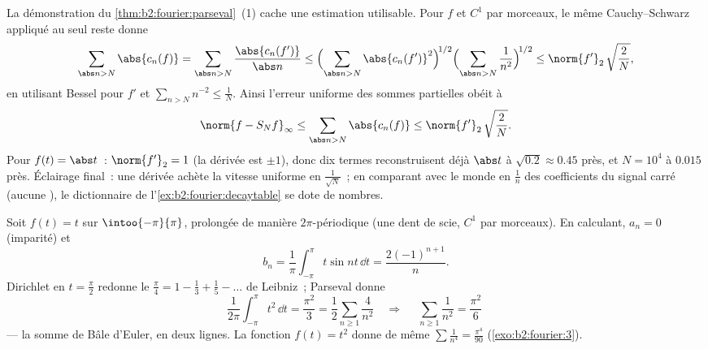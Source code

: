 \begin{example}\label{ex:b2:fourier:tailbound}
La démonstration du \cref{thm:b2:fourier:parseval}~(1) cache une
estimation utilisable. Pour $f$  et $C^1$ par morceaux, le
même Cauchy--Schwarz appliqué au seul reste donne
\[
\sum_{\abs n > N}\abs{c_n(f)}
= \sum_{\abs n > N}\frac{\abs{c_n(f')}}{\abs n}
\leq \Bigl(\sum_{\abs n > N}\abs{c_n(f')}^2\Bigr)^{\!1/2}
\Bigl(\sum_{\abs n>N}\frac{1}{n^2}\Bigr)^{\!1/2}
\leq \norm{f'}_2\,\sqrt{\frac{2}{N}} ,
\]
en utilisant Bessel pour $f'$ et $\sum_{n>N}n^{-2} \leq \frac1N$.
Ainsi l'erreur uniforme des sommes partielles obéit à
\[
\norm{f - S_Nf}_\infty
\leq \sum_{\abs n>N}\abs{c_n(f)}
\leq \norm{f'}_2\,\sqrt{\frac2N} .
\]
Pour $f(t) = \abs t$~: $\norm{f'}_2 = 1$ (la dérivée est $\pm1$),
donc dix termes reconstruisent déjà $\abs t$  à
$\sqrt{0.2} \approx 0.45$ près, et $N = 10^4$ à $0.015$ près.
Éclairage final~: une dérivée achète la vitesse uniforme en
$\frac{1}{\sqrt N}$~; en comparant avec le monde en $\frac1n$ des
coefficients du signal carré (aucune ), le
dictionnaire de l'\cref{ex:b2:fourier:decaytable} se dote de
nombres.
\end{example}

\begin{example}\label{ex:b2:fourier:basel}
Soit $f(t) = t$ sur $\intoo{-\pi}{\pi}$, prolongée de manière
$2\pi$-périodique (une dent de scie, $C^1$ par morceaux). En
calculant, $a_n = 0$ (imparité) et
\[
b_n = \frac{1}{\pi}\int_{-\pi}^{\pi} t\sin nt\,\dd t
= \frac{2(-1)^{n+1}}{n} .
\]
Dirichlet en $t = \frac\pi2$ redonne le $\frac\pi4 = 1 - \frac13 +
\frac15 - \dots$ de Leibniz~; Parseval donne
\[
\frac{1}{2\pi}\int_{-\pi}^{\pi} t^2\,\dd t = \frac{\pi^2}{3}
= \frac12\sum_{n\geq1}\frac{4}{n^2}
\quad\Longrightarrow\quad
\boxed{\;\sum_{n\geq1}\frac{1}{n^2} = \frac{\pi^2}{6}\;}
\]
--- la somme de Bâle d'Euler, en deux lignes. La fonction $f(t) =
t^2$ donne de même $\sum \frac1{n^4} = \frac{\pi^4}{90}$
(\cref{exo:b2:fourier:3}).
\end{example}

